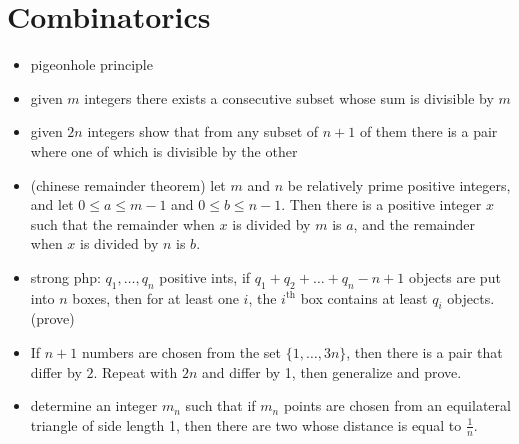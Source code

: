 \section{Combinatorics}\label{sec:combinatorics}

\begin{itemize}
\item pigeonhole principle
\item given $m$ integers there exists a consecutive subset whose sum is divisible by $m$
\item given $2n$ integers show that from any subset of $n+1$ of them there is a pair where one of which is divisible by the other
\item (chinese remainder theorem) let $m$ and $n$ be relatively prime positive integers, and let $0 \leq a \leq m-1$ and $0 \leq b \leq n-1$.  Then there is a positive integer $x$ such that the remainder when $x$ is divided by $m$ is $a$, and the remainder when $x$ is divided by $n$ is $b$.
\item strong php: $q_1, \ldots, q_n$ positive ints, if $q_1 + q_2 + \ldots + q_n -n + 1$ objects are put into $n$ boxes, then for at least one $i$, the $i^{\text{th}}$ box contains at least $q_i$ objects. (prove)
\item If $n+1 $ numbers are chosen from the set $\{1, \ldots, 3n\}$, then there is a pair that differ by $2$.  Repeat with $2n$ and differ by 1, then generalize and prove.
\item determine an integer $m_n$ such that if $m_n$ points are chosen from an equilateral triangle of side length 1, then there are two whose distance is equal to $\frac{1}{n}$.


\end{itemize}
